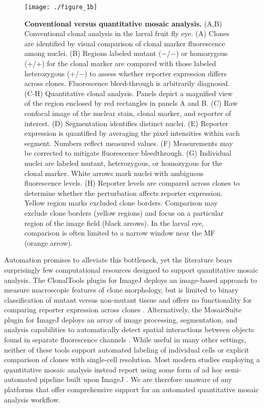 \begin{figure}[!h]
\centering
\texttt{[image: ./figure\_1b]}
\caption[Conventional versus quantitative mosaic analysis.]{\textbf{Conventional versus quantitative mosaic analysis.} (A,B) Conventional clonal analysis in the larval fruit fly eye. (A) Clones are identified by visual comparison of clonal marker fluorescence among nuclei. (B) Regions labeled mutant ($-$/$-$) or homozygous (+/+) for the clonal marker are compared with those labeled heterozygous (+/$-$) to assess whether reporter expression differs across clones. Fluorescence bleed-through is arbitrarily diagnosed. (C-H) Quantitative clonal analysis. Panels depict a magnified view of the region enclosed by red rectangles in panels A and B. (C) Raw confocal image of the nuclear stain, clonal marker, and reporter of interest. (D) Segmentation identifies distinct nuclei. (E) Reporter expression is quantified by averaging the pixel intensities within each segment. Numbers reflect measured values. (F) Measurements may be corrected to mitigate fluorescence bleedthrough. (G) Individual nuclei are labeled mutant, heterozygous, or homozygous for the clonal marker. White arrows mark nuclei with ambiguous fluorescence levels. (H) Reporter levels are compared across clones to determine whether the perturbation affects reporter expression. Yellow region marks excluded clone borders. Comparison may exclude clone borders (yellow regions) and focus on a particular region of the image field (black arrows). In the larval eye, comparison is often limited to a narrow window near the MF (orange arrow).}
\label{fig:fig1b}
\end{figure}

Automation promises to alleviate this bottleneck, yet the literature bears surprisingly few computational resources designed to support quantitative mosaic analysis. The ClonalTools plugin for ImageJ deploys an image-based approach to measure macroscopic features of clone morphology, but is limited to binary classification of mutant versus non-mutant tissue and offers no functionality for comparing reporter expression across clones \cite{Mort2009}. Alternatively, the MosaicSuite plugin for ImageJ deploys an array of image processing, segmentation, and analysis capabilities to automatically detect spatial interactions between objects found in separate fluorescence channels \cite{Helmuth2010,Shivanandan2013}. While useful in many other settings, neither of these tools support automated labeling of individual cells or explicit comparison of clones with single-cell resolution. Most modern studies employing a quantitative mosaic analysis instead report using some form of ad hoc semi-automated pipeline built upon ImageJ \cite{Dai2017,Ghiglione2018,Li2018}. We are therefore unaware of any platforms that offer comprehensive support for an automated quantitative mosaic analysis workflow.

